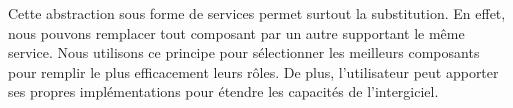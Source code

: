 Cette abstraction sous forme de services permet surtout la substitution. En effet, nous pouvons remplacer tout composant par un autre supportant le même service. Nous utilisons ce principe pour sélectionner les meilleurs composants pour remplir le plus efficacement leurs rôles. De plus, l'utilisateur peut apporter ses propres implémentations pour étendre les capacités de l'intergiciel.
